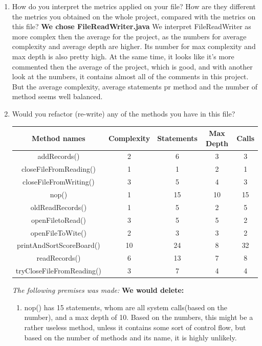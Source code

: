 \documentclass{article}
\begin{document}
\begin{enumerate}
\item
How do you interpret the metrics applied on your file? How are they different the metrics you
obtained on the whole project, compared with the metrics on this file?\newline
\textbf{We chose FileReadWriter.java}\newline
We interpret FileReadWriter as more complex then the average for the project, as the 
numbers for average complexity and average depth are higher. Its number for max complexity and
max depth is also pretty high. At the same time, it looks like it's more commented then
the average of the project, which is good, and with another look at the numbers, it contains 
almost all of the comments in this project. But the average complexity, average statements
pr method and the number of method seems well balanced.

\item
Would	you	refactor	(re-write)	any	of	the	methods you	have	in	this	file?	

\begin{tabulary}{0.5\textwidth}{| c | c | c | c | c |}
 \hline
\textbf{Method names} &	\textbf{Complexity} & \textbf{Statements} & \textbf{Max Depth} & \textbf{Calls} \\ \hline

addRecords()				& 2 & 6 & 3 & 3 \\ \hline
closeFileFromReading() 		& 1 & 1 & 2 & 1 \\ \hline
closeFileFromWriting() 		& 3 & 5 & 4 & 3 \\ \hline
nop() 				  		& 1 & 15 & 10 & 15 \\ \hline
oldReadRecords()		  	& 1 & 5 & 2 & 5 \\ \hline
openFiletoRead()			& 3 & 5 & 5 & 2 \\ \hline
openFileToWite()			& 2 & 3 & 3 & 2 \\ \hline
printAndSortScoreBoard()	& 10 & 24 & 8 & 32 \\ \hline
readRecords()				& 6 & 13 & 7 & 8 \\ \hline
tryCloseFileFromReading()	& 3 & 7 & 4 & 4 \\ \hline
\end{tabulary}
\vspace{0.2cm}
\newline
\textit{The following premises was made:}\newline
\vspace{0.1cm}
\textbf{We would delete:}
\vspace{0.1cm}
\begin{enumerate}
\item
nop() has 15 statements, whom are all system calls(based on the number), and a max depth of 10. Based on the numbers, this might be a rather useless method, unless it contains some sort of control flow, but based on the number of methods and its name, it is highly unlikely.


\end{enumerate}
\end{enumerate}
\end{document}
